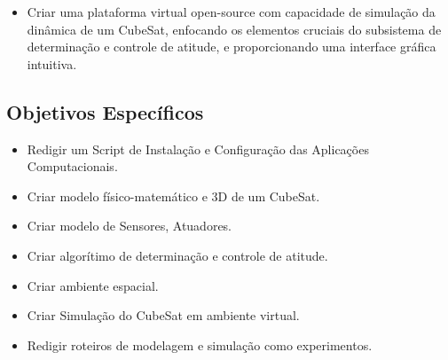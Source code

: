 \begin{itemize}
    \item Criar uma plataforma virtual open-source com capacidade de simulação da dinâmica de um CubeSat, enfocando os elementos cruciais do subsistema de determinação e controle de atitude, e proporcionando uma interface gráfica intuitiva.
\end{itemize}

\subsection*{Objetivos Específicos}\label{sec:Objetivos Específicos}
\begin{itemize}
    \item Redigir um Script de Instalação e Configuração das Aplicações Computacionais.
    \item Criar modelo físico-matemático e 3D de um CubeSat.
    \item Criar modelo de Sensores, Atuadores.
    \item Criar algorítimo de determinação e controle de atitude.
    \item Criar ambiente espacial.
    \item  Criar Simulação do CubeSat em ambiente virtual.
    \item Redigir roteiros de modelagem e simulação como experimentos.
\end{itemize}
